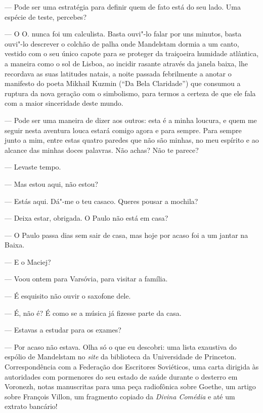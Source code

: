 --- Pode ser uma estratégia para definir quem de fato está do seu lado.
  Uma espécie de teste, percebes?

--- O O. nunca foi um calculista. Basta ouvi"-lo falar por uns minutos,
  basta ouvi"-lo descrever o colchão de palha onde Mandelstam dormia a um
  canto, vestido com o seu único capote para se proteger da traiçoeira
  humidade atlântica, a maneira como o sol de Lisboa, ao incidir rasante
  através da janela baixa, lhe recordava as suas latitudes natais, a
  noite passada febrilmente a anotar o manifesto do poeta Mikhail Kuzmin
  (``Da Bela Claridade'') que consumou a ruptura da
nova geração com o simbolismo, para termos a certeza de que ele fala com
a maior sinceridade deste mundo.

--- Pode ser uma maneira de dizer aos outros: esta é a minha loucura, e
  quem me seguir nesta aventura louca estará comigo agora e para sempre.
  Para sempre junto a mim, entre estas quatro paredes que não são
  minhas, no meu espírito e ao alcance das minhas doces palavras. Não
  achas? Não te parece?

\medskip
\asterisc
\medskip

--- Levaste tempo.

--- Mas estou aqui, não estou?

--- Estás aqui. Dá"-me o teu casaco. Queres pousar a mochila?

--- Deixa estar, obrigada. O Paulo não está em casa?

--- O Paulo passa dias sem sair de casa, mas hoje por acaso foi a um
  jantar na Baixa.

--- E o Maciej?

--- Voou ontem para Varsóvia, para visitar a família.

--- É esquisito não ouvir o saxofone dele.

--- É, não é? É como se a música já fizesse parte da casa.

--- Estavas a estudar para os exames?

--- Por acaso não estava. Olha só o que eu descobri: uma lista exaustiva
  do espólio de Mandelstam no \emph{site }da biblioteca da
  Universidade de Princeton. Correspondência com a Federação dos
  Escritores Soviéticos, uma carta dirigida às autoridades com
  pormenores do seu estado de saúde durante o desterro em Voronezh,
  notas manuscritas para uma peça radiofônica sobre Goethe, um artigo
  sobre François Villon,
um fragmento copiado da \emph{Divina Comédia }e até um extrato
bancário!

